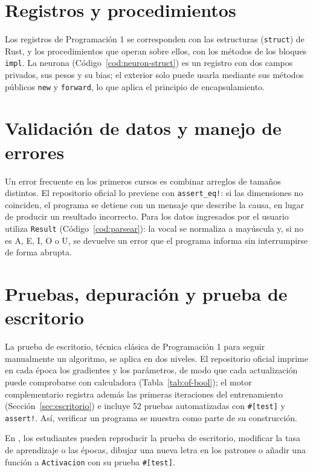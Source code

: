 \section{Registros y procedimientos}
Los registros de Programación 1 se corresponden con las estructuras (\texttt{struct}) de Rust, y los procedimientos que operan sobre ellos, con los métodos de los bloques \texttt{impl}. La neurona (Código~\ref{cod:neuron-struct}) es un registro con dos campos privados, sus pesos y su bias; el exterior solo puede usarla mediante sus métodos públicos \texttt{new} y \texttt{forward}, lo que aplica el principio de encapsulamiento.



\section{Validación de datos y manejo de errores}
Un error frecuente en los primeros cursos es combinar arreglos de tamaños distintos. El repositorio oficial lo previene con \texttt{assert\_eq!}: si las dimensiones no coinciden, el programa se detiene con un mensaje que describe la causa, en lugar de producir un resultado incorrecto. Para los datos ingresados por el usuario utiliza \texttt{Result} (Código~\ref{cod:parsear}): la vocal se normaliza a mayúscula y, si no es A, E, I, O o U, se devuelve un error que el programa informa sin interrumpirse de forma abrupta.



\section{Pruebas, depuración y prueba de escritorio}
La prueba de escritorio, técnica clásica de Programación 1 para seguir manualmente un algoritmo, se aplica en dos niveles. El repositorio oficial imprime en cada época los gradientes y los parámetros, de modo que cada actualización puede comprobarse con calculadora (Tabla~\ref{tab:of-bool}); el motor complementario registra además las primeras iteraciones del entrenamiento (Sección~\ref{sec:escritorio}) e incluye 52 pruebas automatizadas con \texttt{\#[test]} y \texttt{assert!}. Así, verificar un programa se muestra como parte de su construcción.

\begin{nota}
En \Sigla, los estudiantes pueden reproducir la prueba de escritorio, modificar la tasa de aprendizaje o las épocas, dibujar una nueva letra en los patrones o añadir una función a \texttt{Activacion} con su prueba \texttt{\#[test]}.
\end{nota}
